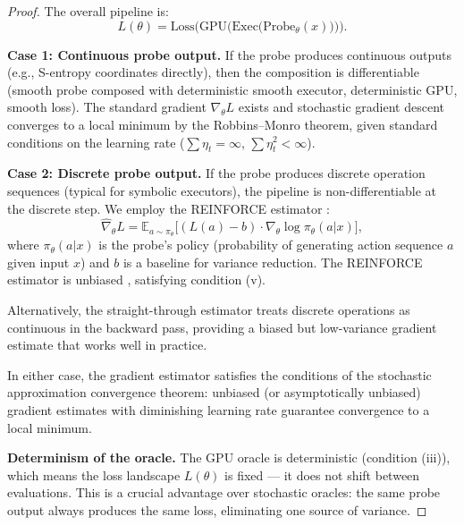 \documentclass[11pt,twocolumn,a4paper]{article}
\begin{document}
\begin{proof}
The overall pipeline is:
\begin{equation}
L(\theta) = \text{Loss}\big(\text{GPU}\big(
  \text{Exec}\big(\text{Probe}_\theta(x)\big)\big)\big).
\label{eq:pipeline}
\end{equation}

\textbf{Case 1: Continuous probe output.} If the probe produces
continuous outputs (e.g., S-entropy coordinates directly), then
the composition is differentiable (smooth probe composed with
deterministic smooth executor, deterministic GPU, smooth loss). The
standard gradient $\nabla_\theta L$ exists and stochastic gradient
descent converges to a local minimum by the Robbins--Monro theorem,
given standard conditions on the learning rate
($\sum \eta_t = \infty$, $\sum \eta_t^2 < \infty$).

\textbf{Case 2: Discrete probe output.} If the probe produces
discrete operation sequences (typical for symbolic executors), the
pipeline is non-differentiable at the discrete step. We employ the
REINFORCE estimator \citep{williams1992}:
\begin{equation}
\hat{\nabla}_\theta L = \mathbb{E}_{a \sim \pi_\theta}
  \big[(L(a) - b) \cdot \nabla_\theta \log \pi_\theta(a|x)\big],
\label{eq:reinforce}
\end{equation}
where $\pi_\theta(a|x)$ is the probe's policy (probability of
generating action sequence $a$ given input $x$) and $b$ is a
baseline for variance reduction. The REINFORCE estimator is
unbiased \citep{williams1992,sutton1999}, satisfying condition (v).

Alternatively, the straight-through estimator
\citep{bengio2013estimating} treats discrete operations as continuous
in the backward pass, providing a biased but low-variance gradient
estimate that works well in practice.

In either case, the gradient estimator satisfies the conditions of
the stochastic approximation convergence theorem: unbiased (or
asymptotically unbiased) gradient estimates with diminishing learning
rate guarantee convergence to a local minimum.

\textbf{Determinism of the oracle.} The GPU oracle is deterministic
(condition (iii)), which means the loss landscape $L(\theta)$ is fixed
--- it does not shift between evaluations. This is a crucial
advantage over stochastic oracles: the same probe output always
produces the same loss, eliminating one source of variance. \qedhere
\end{proof}
\end{document}
